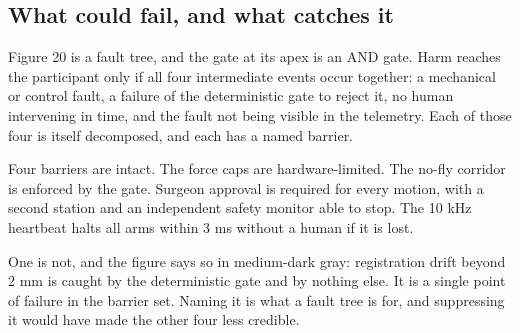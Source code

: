 \vspace{-0.7cm}

\subsection{What could fail, and what catches it}

Figure 20 is a fault tree, and the gate at its apex is an AND gate. Harm reaches
the participant only if all four intermediate events occur together: a
mechanical or control fault, a failure of the deterministic gate to reject it,
no human intervening in time, and the fault not being visible in the telemetry.
Each of those four is itself decomposed, and each has a named barrier.

Four barriers are intact. The force caps are hardware-limited. The no-fly
corridor is enforced by the gate. Surgeon approval is required for every motion,
with a second station and an independent safety monitor able to stop. The 10 kHz
heartbeat halts all arms within 3 ms without a human if it is lost.

One is not, and the figure says so in medium-dark gray: registration drift
beyond 2 mm is caught by the deterministic gate and by nothing else. It is a
single point of failure in the barrier set. Naming it is what a fault tree is
for, and suppressing it would have made the other four less credible.

